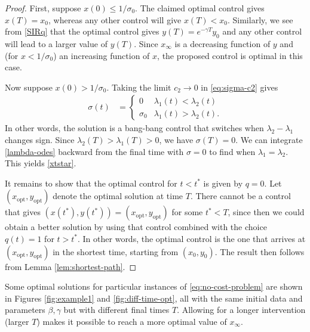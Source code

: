 \documentclass[english,12pt,letter]{article}
\newcommand{\Rnot}{\sigma_0}
\newcommand{\Sinf}{x_\infty}
\newcommand{\xopt}{x_\text{opt}}
\newcommand{\yopt}{y_\text{opt}}
\begin{document}
\begin{proof}
First, suppose $x(0)\le1/\sigma_0$.  The claimed optimal control gives $x(T)=x_0$, whereas
any other control will give $x(T)<x_0$.  Similarly, we see from \eqref{SIRq} that
the optimal control gives $y(T)=e^{-\gamma T}y_0$ and any other control will
lead to a larger value of $y(T)$.  Since $\Sinf$ is a decreasing function of $y$ and
(for $x<1/\Rnot$) an increasing function of $x$, the proposed control is optimal in this case.

Now suppose $x(0)>1/\sigma_0$.  Taking the limit $c_2\to 0$ in \eqref{eq:sigma-c2} gives
\begin{align}
    \sigma(t) & = \begin{cases} 0 & \lambda_1(t)<\lambda_2(t) \\ \sigma_0 & \lambda_1(t) > \lambda_2(t). \end{cases}
\end{align}
In other words, the solution is a bang-bang control that switches when $\lambda_2-\lambda_1$ changes sign.
Since $\lambda_2(T)>\lambda_1(T)>0$, we have $\sigma(T)=0$.  We can integrate \eqref{lambda-odes} backward from the final
time with $\sigma=0$ to find when $\lambda_1=\lambda_2$.  This yields \eqref{xtstar}.

It remains to show that the optimal control for $t<t^*$ is given by $q=0$.  
Let $(\xopt,\yopt)$ denote the optimal solution at time $T$.  There cannot be a
control that gives $(x(t^*),y(t^*)) = (\xopt,\yopt)$ for some $t^*<T$, since then
we could obtain a better solution by using that control combined with the choice
$q(t)=1$ for $t>t^*$.  In other words,
the optimal control is the one that arrives at $(\xopt,\yopt)$ in the shortest time,
starting from $(x_0,y_0)$.  The result then follows from Lemma \ref{lem:shortest-path}.
\end{proof}

Some optimal solutions for particular instances of \eqref{eq:no-cost-problem}
are shown in Figures \ref{fig:example1} and \ref{fig:diff-time-opt},
all with the same initial data and parameters $\beta, \gamma$ but with different final
times $T$.  Allowing for a longer intervention (larger $T$) makes it possible to reach
a more optimal value of $\Sinf$.
\end{document}
